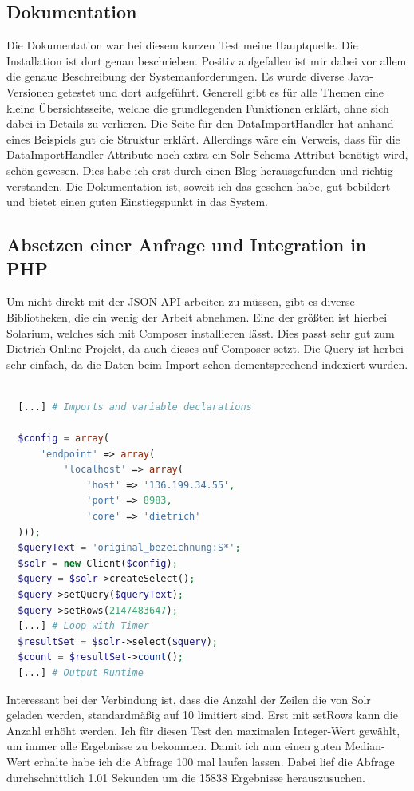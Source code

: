 \subsection{Dokumentation}

Die Dokumentation war bei diesem kurzen Test meine Hauptquelle. Die Installation ist dort genau beschrieben. Positiv aufgefallen ist mir dabei vor allem die genaue Beschreibung der Systemanforderungen. Es wurde diverse Java-Versionen getestet und dort aufgeführt. 
Generell gibt es für alle Themen eine kleine Übersichtsseite, welche die grundlegenden Funktionen erklärt, ohne sich dabei in Details zu verlieren. 
Die Seite für den DataImportHandler hat anhand eines Beispiels gut die Struktur erklärt. Allerdings wäre ein Verweis, dass für die DataImportHandler-Attribute noch extra ein Solr-Schema-Attribut benötigt wird, schön gewesen. Dies habe ich erst durch einen Blog \cite{IqubalMustafaKaki.2016} herausgefunden und richtig verstanden. 
Die Dokumentation ist, soweit ich das gesehen habe, gut bebildert und bietet einen guten Einstiegspunkt in das System.

\subsection{Absetzen einer Anfrage und Integration in PHP}

Um nicht direkt mit der JSON-API arbeiten zu müssen, gibt es diverse Bibliotheken, die ein wenig der Arbeit abnehmen. Eine der größten ist hierbei Solarium, welches sich mit Composer installieren lässt. Dies passt sehr gut zum Dietrich-Online Projekt, da auch dieses auf Composer setzt. 
Die Query ist herbei sehr einfach, da die Daten beim Import schon dementsprechend indexiert wurden.

\begin{lstlisting}[language=php, frame=single, label={lst:SolrPhp}, 
  morekeywords={type,uninvertible,indexed,stored,field,multiValued, name}] 

  [...] # Imports and variable declarations

  $config = array(
      'endpoint' => array(
          'localhost' => array(
              'host' => '136.199.34.55',
              'port' => 8983,
              'core' => 'dietrich'
  )));
  $queryText = 'original_bezeichnung:S*';
  $solr = new Client($config);
  $query = $solr->createSelect();
  $query->setQuery($queryText);
  $query->setRows(2147483647); 
  [...] # Loop with Timer
  $resultSet = $solr->select($query);
  $count = $resultSet->count();
  [...] # Output Runtime
\end{lstlisting}

Interessant bei der Verbindung ist, dass die Anzahl der Zeilen die von Solr geladen werden, standardmäßig auf 10 limitiert sind. Erst mit setRows kann die Anzahl erhöht werden. Ich für diesen Test den maximalen Integer-Wert gewählt, um immer alle Ergebnisse zu bekommen. Damit ich nun einen guten Median-Wert erhalte habe ich die Abfrage 100 mal laufen lassen. Dabei lief die Abfrage durchschnittlich 1.01 Sekunden um die 15838 Ergebnisse herauszusuchen. 
